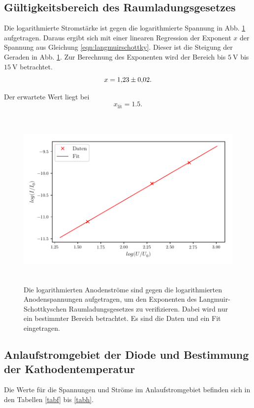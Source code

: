 \subsection{Gültigkeitsbereich des Raumladungsgesetzes}
Die logarithmierte Stromstärke ist gegen die logarithmierte
Spannung in Abb. \ref{fig:plot2} aufgetragen. %
Daraus ergibt sich mit einer linearen Regression der
Exponent $x$ der Spannung aus Gleichung \eqref{eqn:langmuirschottky}.
Dieser ist die Steigung der Geraden in Abb. \ref{fig:plot2}.
Zur Berechnung des Exponenten wird der Bereich bis $\SI{5}{\volt}$ bis $\SI{15}{\volt}$ betrachtet. 
\begin{equation*}
    x = \num{1.23 \pm 0.02}.
\end{equation*}

Der erwartete Wert liegt bei 
\begin{equation*}
    x_\text{lit} = 1.5.
\end{equation*}


\begin{figure}
    \centering
    \includegraphics[width=15cm, height=9cm]{build/plot2.pdf}
    \caption{Die logarithmierten Anodenströme sind gegen die logarithmierten
    Anodenspannungen aufgetragen, um den Exponenten des Langmuir-Schottkyschen
    Raumladungsgesetzes zu verifizieren. Dabei wird nur ein bestimmter
    Bereich betrachtet. Es sind die Daten und ein Fit eingetragen.}
    \label{fig:plot2}
\end{figure}


\subsection{Anlaufstromgebiet der Diode und Bestimmung der Kathodentemperatur}
Die Werte für die Spannungen und Ströme im Anlaufstromgebiet
befinden sich in den Tabellen \ref{tabf} bis \ref{tabh}.

